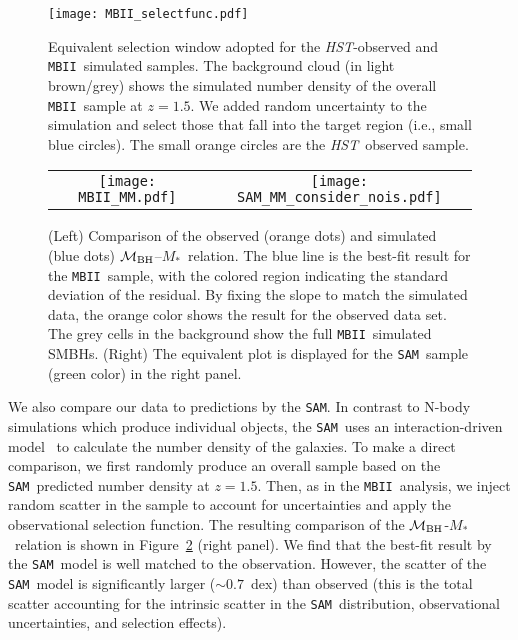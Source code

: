\documentclass[twocolumn,trackchanges]{aastex63}
\newcommand{\hst}{{\it HST}}
\newcommand{\mbh}{$\mathcal M_{\rm BH}$}
\newcommand{\mstar}{{$M_*$}}
\newcommand{\sam}{\texttt{SAM}}
\newcommand{\mbii}{\texttt{MBII}}
\begin{document}
\begin{figure}[t]
\texttt{[image: MBII\_selectfunc.pdf]}
\caption{Equivalent selection window adopted for the \hst-observed and  \mbii\ simulated samples. The background cloud (in light brown/grey) shows the simulated number density of the overall \mbii\ sample at $z=1.5$. We added random uncertainty to the simulation and select those that fall into the target region (i.e., small blue circles). The small orange circles are the \hst\ observed sample.}
\label{fig:selectfunc}
\end{figure}

\begin{figure*}[t]%
\begin{tabular}{c c}
\texttt{[image: MBII\_MM.pdf]} &
\texttt{[image: SAM\_MM\_consider\_nois.pdf]} \\
\end{tabular}
\caption{(Left) Comparison of the observed (orange dots) and simulated (blue dots) \mbh--\mstar\ relation. The blue line is the best-fit result for the \mbii\ sample, with the colored region indicating the standard deviation of the residual. By fixing the slope to match the simulated data, the orange color shows the result for the observed data set. The grey cells in the background show the full \mbii\ simulated SMBHs. (Right) The equivalent plot is displayed for the \sam\ sample (green color) in the right panel.}
\label{fig:MM_comp}
\end{figure*}

We also compare our data to predictions by the \sam. In contrast to N-body simulations which produce individual objects, the \sam\ uses an interaction-driven model~\citep{Menci2014} to calculate the number density of the galaxies. To make a direct comparison, we first randomly produce an overall sample based on the \sam\ predicted number density at $z=1.5$. Then, as in the \mbii\ analysis, we inject random scatter in the sample to account for uncertainties and apply the observational selection function. The resulting comparison of the  \mbh-\mstar\ relation is shown in Figure~\ref{fig:MM_comp} (right panel). We find that the best-fit result by the \sam\ model is well matched to the observation. However, the scatter of the \sam\ model is significantly larger ($\sim0.7$~dex) than observed (this is the total scatter accounting for the intrinsic scatter in the \sam\ distribution, observational uncertainties, and selection effects).  
\end{document}
